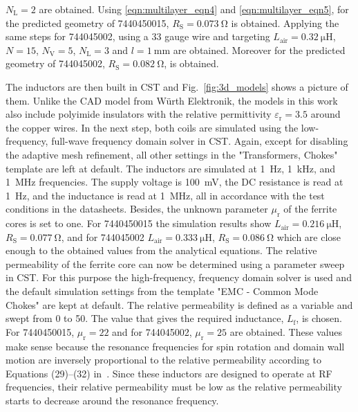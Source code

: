 $N_\mathrm{L} = 2$ are obtained. Using \eqref{eqn:multilayer_eqn4} and \eqref{eqn:multilayer_eqn5}, for the predicted geometry of 7440450015, $R_\mathrm{S} = \SI{0.073}{\ohm}$ is obtained. Applying the same steps for 744045002, using a 33 gauge wire and targeting  $L_\mathrm{air} = \SI{0.32}{\micro\henry}$, $N = 15$, $N_\mathrm{V} = 5$, $N_\mathrm{L} = 3$ and $l = \SI{1}{\milli\meter}$ are obtained. Moreover for the predicted geometry of 744045002, $R_\mathrm{S} = \SI{0.082}{\ohm}$, is obtained. 

The inductors are then built in CST and Fig.~\ref{fig:3d_models} shows a picture of them. Unlike the CAD model from Würth Elektronik, the models in this work also include polyimide insulators with the relative permittivity $\varepsilon_\mathrm{r} = 3.5$ around the copper wires. In the next step, both coils are simulated using the low-frequency, full-wave frequency domain solver in CST. Again, except for disabling the adaptive mesh refinement, all other settings in the "Transformers, Chokes" template are left at default. The inductors are simulated at \SI{1}{\hertz}, \SI{1}{\kilo\hertz}, and \SI{1}{\mega\hertz} frequencies. The supply voltage is \SI{100}{\milli\volt}, the DC resistance is read at \SI{1}{\hertz}, and the inductance is read at \SI{1}{\mega\hertz}, all in accordance with the test conditions in the datasheets. Besides, the unknown parameter $\mu_\mathrm{r}$ of the ferrite cores is set to one. For 7440450015 the simulation results show $L_\mathrm{air} = \SI{0.216}{\micro\henry}$, $R_\mathrm{S} = \SI{0.077}{\ohm}$, and for 744045002 $L_\mathrm{air} = \SI{0.333}{\micro\henry}$, $R_\mathrm{S} = \SI{0.086}{\ohm}$ which are close enough to the obtained values from the analytical equations. The relative permeability of the ferrite core can now be determined using a parameter sweep in CST. For this purpose the high-frequency, frequency domain solver is used and the default simulation settings from the template "EMC - Common Mode Chokes" are kept at default. The relative permeability is defined as a variable and swept from 0 to 50. The value that gives the required inductance, $L_\mathrm{f}$, is chosen. For 7440450015, $\mu_\mathrm{r} = 22$ and for 744045002, $\mu_\mathrm{r} = 25$ are obtained. These values ​​make sense because the resonance frequencies for spin rotation and domain wall motion are inversely proportional to the relative permeability according to Equations (29)--(32) in~\cite{wijn}. Since these inductors are designed to operate at RF frequencies, their relative permeability must be low as the relative permeability starts to decrease around the resonance frequency. 

